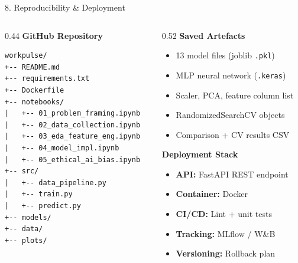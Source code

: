 \documentclass[aspectratio=169, 10pt]{beamer}
\begin{document}
\begin{frame}[fragile]{8. Reproducibility \& Deployment}
\small
\begin{columns}[T]
\begin{column}{0.44\textwidth}
  \textbf{\color{teal}GitHub Repository}\\[2pt]
  \scriptsize
\begin{verbatim}
workpulse/
+-- README.md
+-- requirements.txt
+-- Dockerfile
+-- notebooks/
|   +-- 01_problem_framing.ipynb
|   +-- 02_data_collection.ipynb
|   +-- 03_eda_feature_eng.ipynb
|   +-- 04_model_impl.ipynb
|   +-- 05_ethical_ai_bias.ipynb
+-- src/
|   +-- data_pipeline.py
|   +-- train.py
|   +-- predict.py
+-- models/
+-- data/
+-- plots/
\end{verbatim}
\end{column}
\begin{column}{0.52\textwidth}
  \textbf{\color{amber}Saved Artefacts}
  \begin{itemize}\setlength\itemsep{0pt}\footnotesize
    \item 13 model files (joblib \texttt{.pkl})
    \item MLP neural network (\texttt{.keras})
    \item Scaler, PCA, feature column list
    \item RandomizedSearchCV objects
    \item Comparison + CV results CSV
  \end{itemize}

  \vspace{4pt}
  \textbf{\color{amber}Deployment Stack}
  \begin{itemize}\setlength\itemsep{0pt}\footnotesize
    \item \textbf{API:} FastAPI REST endpoint
    \item \textbf{Container:} Docker
    \item \textbf{CI/CD:} Lint + unit tests
    \item \textbf{Tracking:} MLflow / W\&B
    \item \textbf{Versioning:} Rollback plan
  \end{itemize}
\end{column}
\end{columns}
\end{frame}
\end{document}
